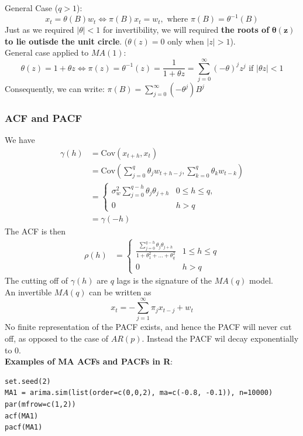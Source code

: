 \documentclass[11pt]{article}
\newcommand{\noi}{\noindent}
\begin{document}
\noi General Case ($q>1$): \\
$$x_t = \theta(B)w_t \Leftrightarrow \pi(B)x_t = w_t, \text{ where } \pi(B) = \theta^{-1}(B)$$
\noi Just as we required $|\theta| < 1$ for invertibility, we will required \textbf{the roots of} $\boldsymbol{\theta(z)}$ \textbf{ to lie outisde the unit circle}. ($\theta(z) = 0$ only when $|z|>1$). \\

\noi General case applied to $MA(1)$:
$$\theta(z) = 1 + \theta z \Leftrightarrow \pi(z) = \theta^{-1}(z) = \frac{1}{1 + \theta z} = \sum_{j=0}^{\infty}{(-\theta)^j z^j} \text{ if } |\theta z| < 1$$
Consequently, we can write: $\pi(B) = \sum_{j=0}^{\infty}{(-\theta^j)B^j}$

\subsubsection{ACF and PACF}
\noi We have
\begin{align*}
    \gamma(h) &= \text{Cov}(x_{t+h}, x_t) \\
    &= \text{Cov}(\sum_{j=0}^{q}{\theta_jw_{t+h-j}}, \sum_{k=0}^{q}{\theta_k w_{t-k}}) \\
    &= \begin{cases}
        \sigma_w^2\sum_{j=0}^{q-h}{\theta_j \theta_{j+h}} & 0 \leq h \leq q, \\
        0 & h > q
    \end{cases} \\
    &= \gamma(-h)
\end{align*}
\noi The ACF is then
\begin{align*}
    \rho(h) &= \begin{cases}
        \frac{\sum_{j=0}^{q-h}{\theta_j \theta_{j+h}}}{1 + \theta_1^2 + ... + \theta_q^2} & 1 \leq h \leq q \\
        0 & h > q
    \end{cases}
\end{align*}
\noi The cutting off of $\gamma(h)$ are $q$ lags is the signature of the $MA(q)$ model. \\

\noi An invertible $MA(q)$ can be written as
$$x_t = -\sum_{j=1}^{\infty}{\pi_jx_{t-j} + w_t}$$
\noi No finite representation of the PACF exists, and hence the PACF will never cut off, as opposed to the case of $AR(p)$. Instead the PACF wil decay exponentially to $0$. \\

\noi \textbf{Examples of MA ACFs and PACFs in R}:
\begin{lstlisting}
set.seed(2)
MA1 = arima.sim(list(order=c(0,0,2), ma=c(-0.8, -0.1)), n=10000)
par(mfrow=c(1,2))
acf(MA1)
pacf(MA1)
\end{lstlisting}
\end{document}
